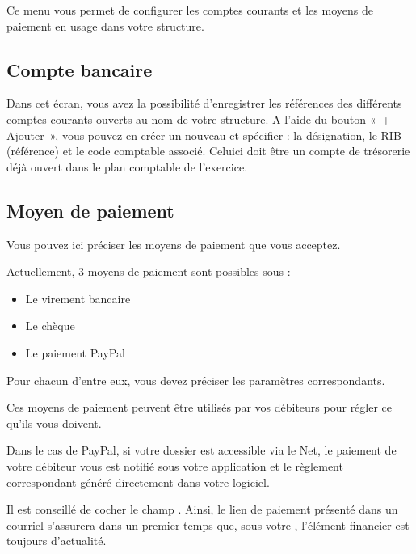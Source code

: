 \documentclass[a4paper,10pt,oneside,french]{sphinxmanual}
\begin{document}
Ce menu vous permet de configurer les comptes courants et les moyens de paiement en usage dans votre structure.


\subsection{Compte bancaire}
\label{\detokenize{payoff/config:compte-bancaire}}
Dans cet écran, vous avez la possibilité d’enregistrer les références des différents comptes courants ouverts au nom de votre structure.
A l’aide du bouton « + Ajouter », vous pouvez en créer un nouveau et spécifier : la désignation, le RIB (référence) et le code comptable associé. Celui\sphinxhyphen{}ci doit être un compte de trésorerie déjà ouvert dans le plan comptable de l’exercice.


\subsection{Moyen de paiement}
\label{\detokenize{payoff/config:moyen-de-paiement}}
Vous pouvez ici préciser les moyens de paiement que vous acceptez.

Actuellement, 3 moyens de paiement sont possibles sous  :
\begin{itemize}
\item {} 
Le virement bancaire

\item {} 
Le chèque

\item {} 
Le paiement PayPal

\end{itemize}

Pour chacun d’entre eux, vous devez préciser les paramètres correspondants.

Ces moyens de paiement peuvent être utilisés par vos débiteurs pour régler ce qu’ils vous doivent.

Dans le cas de PayPal, si votre dossier  est accessible via le Net, le paiement de votre débiteur vous est notifié sous votre application et le règlement correspondant généré directement dans votre logiciel.

Il est conseillé de cocher le champ . Ainsi, le lien de paiement présenté dans un courriel s’assurera dans un premier temps que, sous votre , l’élément financier est toujours d’actualité.
\end{document}

